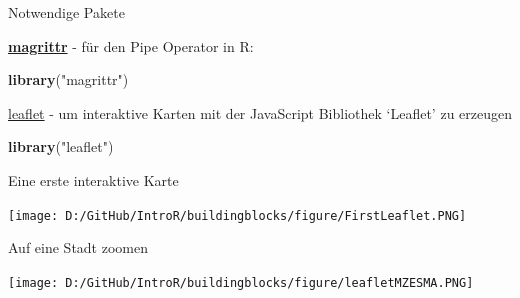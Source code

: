 \documentclass[ignorenonframetext,]{beamer}
\newenvironment{Shaded}{\begin{snugshade}}{\end{snugshade}}
\newcommand{\DataTypeTok}[1]{\textcolor[rgb]{0.74,0.68,0.62}{\underline{#1}}}
\newcommand{\FloatTok}[1]{\textcolor[rgb]{0.27,0.67,0.26}{#1}}
\newcommand{\KeywordTok}[1]{\textcolor[rgb]{0.26,0.66,0.93}{\textbf{#1}}}
\newcommand{\NormalTok}[1]{\textcolor[rgb]{0.74,0.68,0.62}{#1}}
\newcommand{\OperatorTok}[1]{\textcolor[rgb]{0.74,0.68,0.62}{#1}}
\newcommand{\StringTok}[1]{\textcolor[rgb]{0.02,0.61,0.04}{#1}}
\begin{document}
\begin{frame}[fragile]{Notwendige Pakete}
\protect\hypertarget{notwendige-pakete}{}

\begin{block}{\href{https://cran.r-project.org/web/packages/magrittr/index.html}{\textbf{magrittr}}
- für den Pipe Operator in R:}

\begin{Shaded}
\begin{Highlighting}[]
\KeywordTok{library}\NormalTok{(}\StringTok{"magrittr"}\NormalTok{)}
\end{Highlighting}
\end{Shaded}

\href{https://rstudio.github.io/leaflet/}{leaflet} - um interaktive
Karten mit der JavaScript Bibliothek `Leaflet' zu erzeugen

\begin{Shaded}
\begin{Highlighting}[]
\KeywordTok{library}\NormalTok{(}\StringTok{"leaflet"}\NormalTok{)}
\end{Highlighting}
\end{Shaded}

\end{block}

\end{frame}

\begin{frame}[fragile]{Eine erste interaktive Karte}
\protect\hypertarget{eine-erste-interaktive-karte}{}

\begin{Shaded}
\end{Shaded}

\texttt{[image: D:/GitHub/IntroR/buildingblocks/figure/FirstLeaflet.PNG]}

\end{frame}

\begin{frame}[fragile]{Auf eine Stadt zoomen}
\protect\hypertarget{auf-eine-stadt-zoomen}{}

\begin{Shaded}
\end{Shaded}

\texttt{[image: D:/GitHub/IntroR/buildingblocks/figure/leafletMZESMA.PNG]}

\end{frame}
\end{document}
